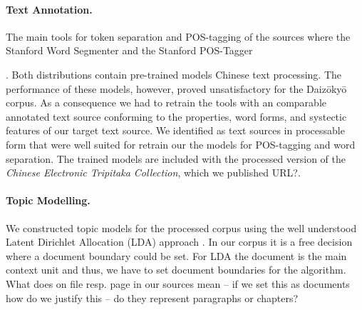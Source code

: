 \documentclass[a4paper,10pt]{article}
\newcommand{\TODO}[1]{\begingroup\color{red}#1\endgroup}
\begin{document}
\paragraph{Text Annotation.} 
  The main tools for token separation and POS-tagging of the sources where
  the Stanford Word Segmenter and the Stanford POS-Tagger {\cite{manning:2014}. 
  Both distributions contain pre-trained models Chinese
  text processing. The performance of these models, however, proved
  unsatisfactory for the Daiz{\=o}ky{\=o} corpus. As a consequence we had
  to retrain the tools with an comparable annotated text source conforming
  to the properties, word forms, and \TODO{systectic} features of our
  target text source.  We identified \cite{Lee:12,Wong:16} as text sources
  in processable form that were well suited for retrain our the models for
  POS-tagging and word separation. The trained models are included with the
  processed version of the \textit{Chinese Electronic Tripitaka Collection},
  which we published \TODO{URL?}.

\paragraph{Topic Modelling.}
  We constructed topic models for the processed corpus using the well
  understood Latent Dirichlet Allocation (LDA) approach 
  \cite{blei:2012,griffiths:2004}. In our corpus it is a free decision where 
  a document boundary could be set.  For LDA the document is the main context 
  unit and thus, we have to set document boundaries for the algorithm. 
  \TODO{What does on file resp. page in our sources mean -- if we set this as 
  documents how do we justify this -- do they represent paragraphs or chapters?}

}
\end{document}
